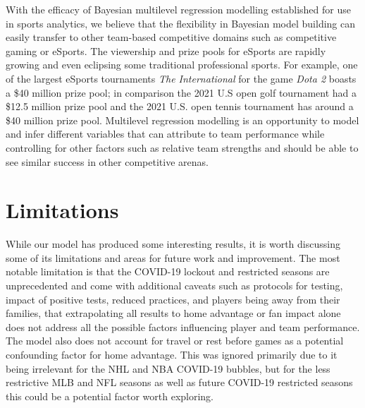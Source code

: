 With the efficacy of Bayesian multilevel regression modelling established for use in sports analytics, we believe that the flexibility in Bayesian model building can easily transfer to other team-based competitive domains such as competitive gaming or eSports. The viewership and prize pools for eSports are rapidly growing and even eclipsing some traditional professional sports. For example, one of the largest eSports tournaments \textit{The International} for the game \textit{Dota 2} boasts a \$40 million prize pool; in comparison the 2021 U.S open golf tournament had a \$12.5 million prize pool and the 2021 U.S. open tennis tournament has around a \$40 million prize pool. Multilevel regression modelling is an opportunity to model and infer different variables that can attribute to team performance while controlling for other factors such as relative team strengths and should be able to see similar success in other competitive arenas.

\section{Limitations}

While our model has produced some interesting results, it is worth discussing some of its limitations and areas for future work and improvement. The most notable limitation is that the COVID-19 lockout and restricted seasons are unprecedented and come with additional caveats such as protocols for testing, impact of positive tests, reduced practices, and players being away from their families, that extrapolating all results to home advantage or fan impact alone does not address all the possible factors influencing player and team performance. The model also does not account for travel or rest before games as a potential confounding factor for home advantage. This was ignored primarily due to it being irrelevant for the NHL and NBA COVID-19 bubbles, but for the less restrictive MLB and NFL seasons as well as future COVID-19 restricted seasons this could be a potential factor worth exploring.

